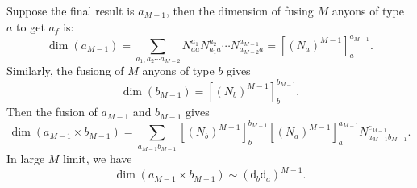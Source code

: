 \documentclass{book}
\begin{document}
Suppose the final result is $a_{M-1}$, then the dimension of fusing $M$ anyons of type $a$ to get $a_{f}$ is:
\begin{equation*}
\dim( a_{M-1}) =\sum _{a_{1} ,a_{2} \cdots a_{M-2}} N_{aa}^{a_{1}} N_{a_{1} a}^{a_{2}} \cdots N_{a_{M-2} a}^{a_{M-1}} =[( N_{a})^{M-1} ]_{a}^{a_{M-1}} .
\end{equation*}
Similarly, the fusiong of $M$ anyons of type $b$ gives
\begin{equation*}
\dim( b_{M-1}) =[( N_{b})^{M-1} ]_{b}^{b_{M-1}} .
\end{equation*}
Then the fusion of $a_{M-1}$ and $b_{M-1}$ gives
\begin{equation*}
\dim( a_{M-1} \times b_{M-1}) =\sum _{a_{M-1} b_{M-1}} [( N_{b})^{M-1} ]_{b}^{b_{M-1}} [( N_{a})^{M-1} ]_{a}^{a_{M-1}} N_{a_{M-1} b_{M-1}}^{c_{M-1}} .
\end{equation*}
In large $M$ limit, we have
\begin{equation*}
\dim( a_{M-1} \times b_{M-1}) \sim (\mathsf{d}_{b}\mathsf{d}_{a})^{M-1} .
\end{equation*}
\end{document}
